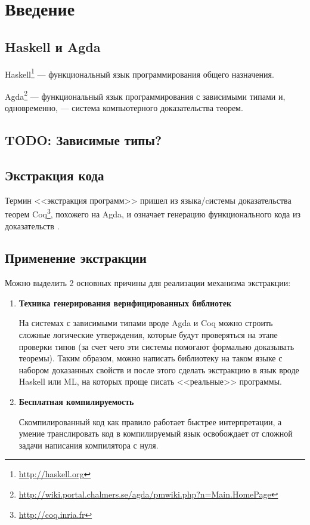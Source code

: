 \section{Введение}

\subsection{Haskell и Agda}

Haskell\footnote{\url{http://haskell.org}} --- функциональный язык программирования
общего назначения.

Agda\footnote{\url{http://wiki.portal.chalmers.se/agda/pmwiki.php?n=Main.HomePage}} ---
функциональный язык программирования с зависимыми типами и, одновременно, ---
система компьютерного доказательства теорем.

\subsection{TODO: Зависимые типы?}

\subsection{Экстракция кода}

Термин <<экстракция программ>> пришел из языка/cистемы доказательства теорем
Coq\footnote{\url{http://coq.inria.fr}}, похожего на Agda, и означает генерацию функционального кода
из доказательств \cite{Let02}.

\subsection{Применение экстракции}

Можно выделить 2 основных причины для реализации механизма экстракции:
\begin{enumerate}
\item \textbf{Техника генерирования верифицированных библиотек}

      На системах с зависимыми типами вроде Agda и Coq можно строить
      сложные логические утверждения, которые будут проверяться на этапе
      проверки типов (за счет чего эти системы помогают формально доказывать теоремы).
      Таким образом, можно написать библиотеку на таком языке с набором доказанных
      свойств и после этого сделать экстракцию в язык вроде Haskell или ML,
      на которых проще писать <<реальные>> программы.

\item \textbf{Бесплатная компилируемость}

      Скомпилированный код как правило работает быстрее интерпретации, а умение
      транслировать код в компилируемый язык освобождает от сложной задачи
      написания компилятора с нуля.
\end{enumerate}

